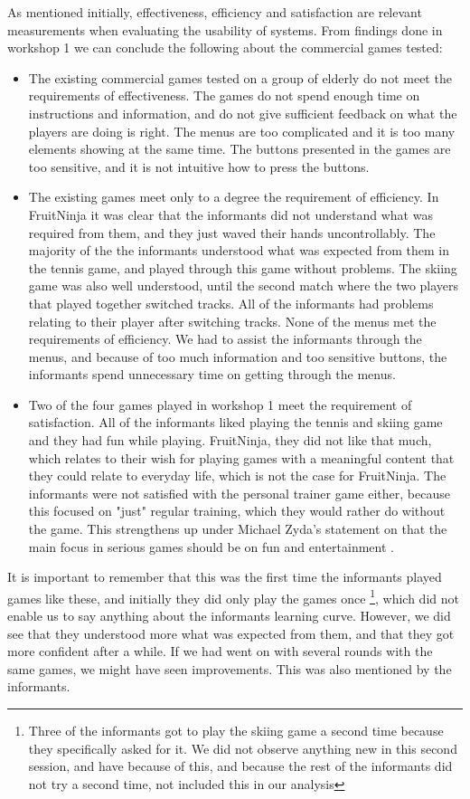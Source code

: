 As mentioned initially, effectiveness, efficiency  and satisfaction are relevant measurements when evaluating the usability of systems. From findings done in workshop 1 we can conclude the following about the commercial games tested: 
\begin{itemize}
\renewcommand{\labelitemi}{$\bullet$}
\item The existing commercial games tested on a group of elderly do not meet the requirements of effectiveness. The games do not spend enough time on instructions and information, and do not give sufficient feedback on what the players are doing is right. The menus are too complicated and it is too many elements showing at the same time. The buttons presented in the games are too sensitive, and it is not intuitive how to press the buttons. 
\item The existing games meet only to a degree the requirement of efficiency. In FruitNinja it was clear that the informants did not understand what was required from them, and they just waved their hands uncontrollably. The majority of the the informants understood what was expected from them in the tennis game, and played through this game without problems. The skiing game was also well understood, until the second match where the two players that played together switched tracks. All of the informants had problems relating to their player after switching tracks. None of the menus met the requirements of efficiency. We had to assist the informants through the menus, and because of too much information and too sensitive buttons, the informants spend unnecessary time on getting through the menus.
\item Two of the four games played in workshop 1 meet the requirement of satisfaction. All of the informants liked playing the tennis and skiing game and they had fun while playing. FruitNinja, they did not like that much, which relates to their wish for playing games with a meaningful content that they could relate to everyday life, which is not the case for FruitNinja. The informants were not satisfied with the personal trainer game either, because this focused on "just" regular training, which they would rather do without the game. This strengthens up under Michael Zyda's statement on that the main focus in serious games should be on fun and entertainment \cite{zyda2005visual}. 
\end{itemize}

It is important to remember that this was the first time the informants played games like these, and initially they did only play the games once \footnote{Three of the informants got to play the skiing game a second time because they specifically asked for it. We did not observe anything new in this second session, and have because of this, and because the rest of the informants did not try a second time, not included this in our analysis}, which did not enable us to say anything about the informants learning curve. However, we did see that they understood more what was expected from them, and that they got more confident after a while. If we had went on with several rounds with the same games, we might have seen improvements. This was also mentioned by the informants. 

